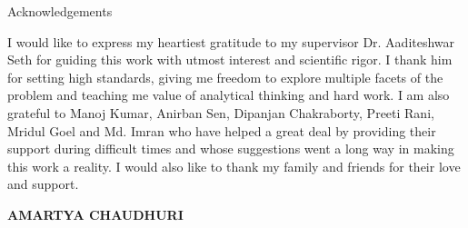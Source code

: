 \begin{center}
\LARGE{Acknowledgements} 
\end{center}

\vspace{0.5in}

I would like to express my heartiest gratitude to my supervisor Dr. Aaditeshwar Seth for guiding this work with utmost interest and scientific rigor. I thank him for setting high standards, giving me freedom to explore multiple facets of the problem and teaching me value of analytical thinking and hard work. I am also grateful to Manoj Kumar, Anirban Sen, Dipanjan Chakraborty, Preeti Rani, Mridul Goel and Md. Imran who have helped a great deal by providing their support during difficult times and whose suggestions went a long way in making this work a reality. I would also like to thank my family and friends for their love and support.\\

\vspace{1.5in}

{\bfseries AMARTYA CHAUDHURI}

